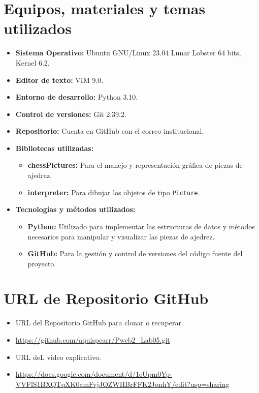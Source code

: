 \documentclass{article}
\begin{document}
		
\section{Equipos, materiales y temas utilizados}
\begin{itemize}
    \item \textbf{Sistema Operativo:} Ubuntu GNU/Linux 23.04 Lunar Lobster 64 bits, Kernel 6.2.
    \item \textbf{Editor de texto:} VIM 9.0.
    \item \textbf{Entorno de desarrollo:} Python 3.10.
    \item \textbf{Control de versiones:} Git 2.39.2.
    \item \textbf{Repositorio:} Cuenta en GitHub con el correo institucional.
    \item \textbf{Bibliotecas utilizadas:}
    \begin{itemize}
        \item \textbf{chessPictures:} Para el manejo y representación gráfica de piezas de ajedrez.
        \item \textbf{interpreter:} Para dibujar los objetos de tipo \texttt{Picture}.
    \end{itemize}
    \item \textbf{Tecnologías y métodos utilizados:}
    \begin{itemize}
        \item \textbf{Python:} Utilizado para implementar las estructuras de datos y métodos necesarios para manipular y visualizar las piezas de ajedrez.
        \item \textbf{GitHub:} Para la gestión y control de versiones del código fuente del proyecto.
    \end{itemize}
\end{itemize}


\section{URL de Repositorio GitHub}
\begin{itemize}
    \item URL del Repositorio GitHub para clonar o recuperar.
    \item \url{https://github.com/aquispearr/Pweb2_Lab05.git}
    \item URL deL video explicativo.
    \item \url{https://docs.google.com/document/d/1eUpm0Yp-VVFlS1BXQTqXK0amFvjJQZWHBrFFK2JonhY/edit?usp=sharing}
\end{itemize}
\end{document}
